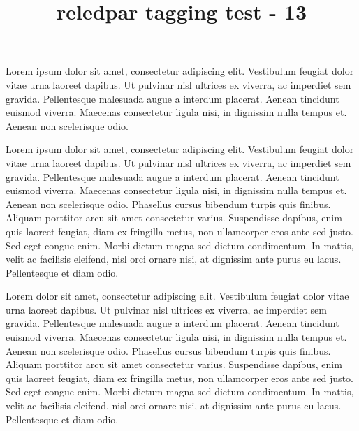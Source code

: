 \documentclass{article}
\title{reledpar tagging test - 13}
\begin{document}
\begin{pairs}
\begin{Leftside}
\beginnumbering
\pstart
Lorem ipsum dolor sit amet, consectetur adipiscing elit. Vestibulum feugiat dolor vitae urna laoreet dapibus. Ut pulvinar nisl ultrices ex viverra, ac imperdiet sem gravida. Pellentesque malesuada augue a interdum placerat. Aenean tincidunt euismod viverra. Maecenas consectetur ligula nisi, in dignissim nulla tempus et. Aenean non scelerisque odio.
\pend
\pausenumbering
\end{Leftside}

\begin{Rightside}
\beginnumbering
\pstart
Lorem ipsum dolor sit amet, consectetur adipiscing elit. Vestibulum feugiat dolor vitae urna laoreet dapibus. Ut pulvinar nisl ultrices ex viverra, ac imperdiet sem gravida. Pellentesque malesuada augue a interdum placerat. Aenean tincidunt euismod viverra. Maecenas consectetur ligula nisi, in dignissim nulla tempus et. Aenean non scelerisque odio. Phasellus cursus bibendum turpis quis finibus. Aliquam porttitor arcu sit amet consectetur varius. Suspendisse dapibus, enim quis laoreet feugiat, diam ex fringilla metus, non ullamcorper eros ante sed justo. Sed eget congue enim. Morbi dictum magna sed dictum condimentum. In mattis, velit ac facilisis eleifend, nisl orci ornare nisi, at dignissim ante purus eu lacus. Pellentesque et diam odio.
\pend
\pausenumbering
\end{Rightside}

\end{pairs}
\Columns

\resumenumbering
\pstart
Lorem  dolor sit amet, consectetur adipiscing elit. Vestibulum feugiat dolor vitae urna laoreet dapibus. Ut pulvinar nisl ultrices ex viverra, ac imperdiet sem gravida. Pellentesque malesuada augue a interdum placerat. Aenean tincidunt euismod viverra. Maecenas consectetur ligula nisi, in dignissim nulla tempus et. Aenean non scelerisque odio. Phasellus cursus bibendum turpis quis finibus. Aliquam porttitor arcu sit amet consectetur varius. Suspendisse dapibus, enim quis laoreet feugiat, diam ex fringilla metus, non ullamcorper eros ante sed justo. Sed eget congue enim. Morbi dictum magna sed dictum condimentum. In mattis, velit ac facilisis eleifend, nisl orci ornare nisi, at dignissim ante purus eu lacus. Pellentesque et diam odio.
\pend
\pausenumbering
\end{document}
